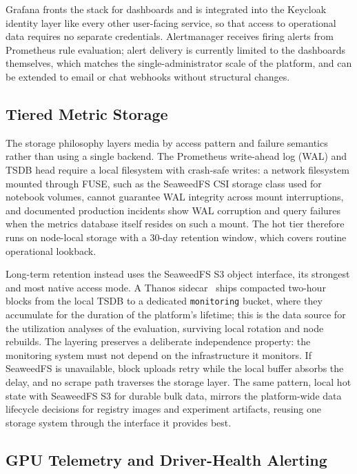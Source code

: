 Grafana fronts the stack for dashboards and is integrated into the Keycloak identity layer like every other user-facing service, so that access to operational data requires no separate credentials. Alertmanager receives firing alerts from Prometheus rule evaluation; alert delivery is currently limited to the dashboards themselves, which matches the single-administrator scale of the platform, and can be extended to email or chat webhooks without structural changes.

\subsection{Tiered Metric Storage}

The storage philosophy layers media by access pattern and failure semantics rather than using a single backend. The Prometheus write-ahead log (WAL) and TSDB head require a local filesystem with crash-safe writes: a network filesystem mounted through FUSE, such as the SeaweedFS CSI storage class used for notebook volumes, cannot guarantee WAL integrity across mount interruptions, and documented production incidents show WAL corruption and query failures when the metrics database itself resides on such a mount. The hot tier therefore runs on node-local storage with a 30-day retention window, which covers routine operational lookback.

Long-term retention instead uses the SeaweedFS S3 object interface, its strongest and most native access mode. A Thanos sidecar~\citep{thanos} ships compacted two-hour blocks from the local TSDB to a dedicated \texttt{monitoring} bucket, where they accumulate for the duration of the platform's lifetime; this is the data source for the utilization analyses of the evaluation, surviving local rotation and node rebuilds. The layering preserves a deliberate independence property: the monitoring system must not depend on the infrastructure it monitors. If SeaweedFS is unavailable, block uploads retry while the local buffer absorbs the delay, and no scrape path traverses the storage layer. The same pattern, local hot state with SeaweedFS S3 for durable bulk data, mirrors the platform-wide data lifecycle decisions for registry images and experiment artifacts, reusing one storage system through the interface it provides best.

\subsection{GPU Telemetry and Driver-Health Alerting}

